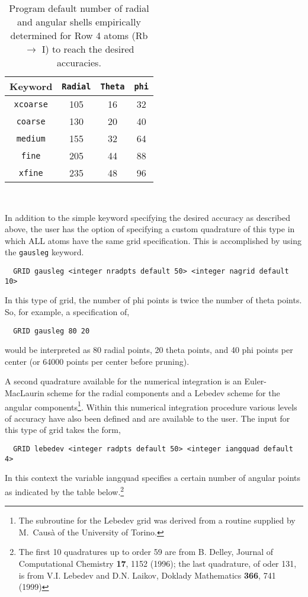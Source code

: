 \begin{table}[h]
\begin{center}
\caption{Program default number of radial and angular shells empirically determined for Row 4 atoms
  (Rb $\rightarrow$ I) to reach the desired accuracies.}

\vspace{.2in}

  \begin{tabular}[right]{|c|c|c|c|} \hline
Keyword & {\tt Radial} & {\tt Theta} & {\tt phi} \\ \hline
{\tt xcoarse} &105 & 16 & 32  \\ \hline
{\tt coarse}  &130 & 20 & 40  \\ \hline
{\tt medium}  &155 & 32 & 64  \\ \hline
{\tt fine}    &205 & 44 & 88  \\ \hline
{\tt xfine}   &235 & 48 & 96  \\ \hline
  \end{tabular} \\
\end{center}
\end{table}


In addition to the simple keyword specifying the desired accuracy as
described above, the user has the option of specifying a custom
quadrature of this type in which ALL atoms have the same grid
specification.  This is accomplished by using the \verb+gausleg+ keyword.

\begin{verbatim}
  GRID gausleg <integer nradpts default 50> <integer nagrid default 10> 
\end{verbatim}

In this type of grid, the number of phi points is twice the number of
theta points. So, for example, a specification of,
\begin{verbatim}
  GRID gausleg 80 20
\end{verbatim}
would be interpreted as 80 radial points, 20 theta points, and 40
phi points per center (or 64000 points per center before pruning).

A second quadrature available for the numerical integration is an
Euler-Mac\-Laurin scheme for the radial components and a Lebedev
scheme for the angular components\footnote{The subroutine 
for the Lebedev grid was derived from a routine supplied by M.~Caus\`a
of the University of Torino.}.  
Within this numerical integration procedure various levels 
of accuracy have also been defined and are available to the user.  
The input for this type of grid takes the form,
\begin{verbatim}
  GRID lebedev <integer radpts default 50> <integer iangquad default 4> 
\end{verbatim}
In this context the variable iangquad specifies a certain number of
angular points as indicated by the table below.\footnote{The first 10
quadratures up to order 59 are from
B. Delley, Journal of Computational Chemistry {\bf 17}, 1152 (1996);
the last quadrature, of oder 131, is from
V.I. Lebedev and D.N. Laikov, Doklady Mathematics {\bf 366}, 741 (1999)
}

